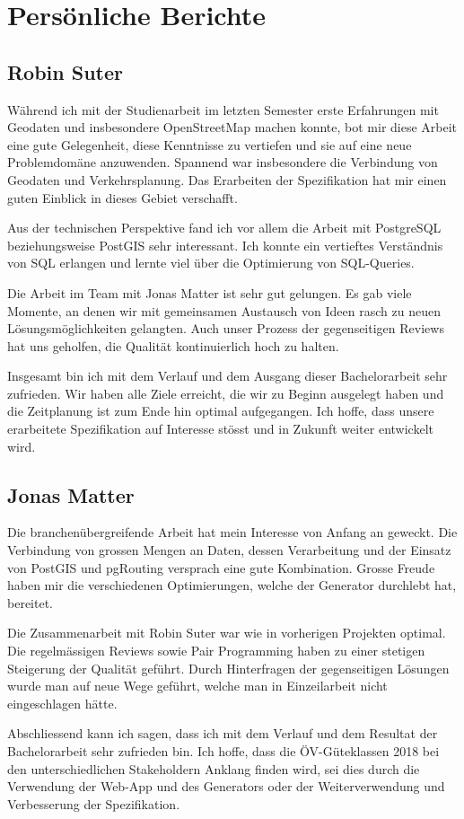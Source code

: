 
\section{Persönliche Berichte}
\label{Persönliche Berichte}

\subsection{Robin Suter}
\label{Persönliche Berichte:Robin Suter}

Während ich mit der Studienarbeit im letzten Semester erste Erfahrungen mit Geodaten und insbesondere \gls{OpenStreetMap} machen konnte, bot mir diese Arbeit eine gute Gelegenheit, diese Kenntnisse zu vertiefen und sie auf eine neue Problemdomäne anzuwenden.
Spannend war insbesondere die Verbindung von Geodaten und Verkehrsplanung.
Das Erarbeiten der Spezifikation hat mir einen guten Einblick in dieses Gebiet verschafft.

Aus der technischen Perspektive fand ich vor allem die Arbeit mit PostgreSQL beziehungsweise PostGIS sehr interessant.
Ich konnte ein vertieftes Verständnis von SQL erlangen und lernte viel über die Optimierung von SQL-Queries.

Die Arbeit im Team mit Jonas Matter ist sehr gut gelungen.
Es gab viele Momente, an denen wir mit gemeinsamen Austausch von Ideen rasch zu neuen Lösungsmöglichkeiten gelangten.
Auch unser Prozess der gegenseitigen Reviews hat uns geholfen, die Qualität kontinuierlich hoch zu halten.

Insgesamt bin ich mit dem Verlauf und dem Ausgang dieser Bachelorarbeit sehr zufrieden.
Wir haben alle Ziele erreicht, die wir zu Beginn ausgelegt haben und die Zeitplanung ist zum Ende hin optimal aufgegangen.
Ich hoffe, dass unsere erarbeitete Spezifikation auf Interesse stösst und in Zukunft weiter entwickelt wird.

\subsection{Jonas Matter}
\label{Persönliche Berichte:Jonas Matter}

Die branchenübergreifende Arbeit hat mein Interesse von Anfang an geweckt.
Die Verbindung von grossen Mengen an Daten, dessen Verarbeitung und der Einsatz von PostGIS und pgRouting versprach eine gute Kombination.
Grosse Freude haben mir die verschiedenen Optimierungen, welche der Generator durchlebt hat, bereitet.

Die Zusammenarbeit mit Robin Suter war wie in vorherigen Projekten optimal.
Die regelmässigen Reviews sowie Pair Programming haben zu einer stetigen Steigerung der Qualität geführt.
Durch Hinterfragen der gegenseitigen Lösungen wurde man auf neue Wege geführt, welche man in Einzeilarbeit nicht eingeschlagen hätte.

Abschliessend kann ich sagen, dass ich mit dem Verlauf und dem Resultat der Bachelorarbeit sehr zufrieden bin.
Ich hoffe, dass die ÖV-Güteklassen 2018 bei den unterschiedlichen Stakeholdern Anklang finden wird, sei dies durch die Verwendung der Web-App und des Generators oder der Weiterverwendung und Verbesserung der Spezifikation.
